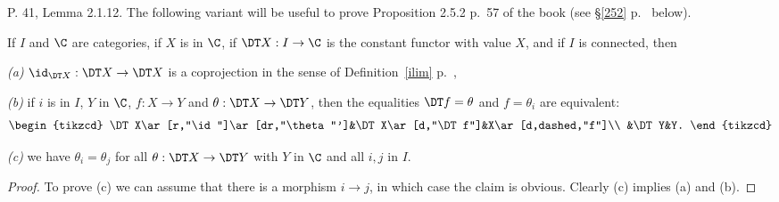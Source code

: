\documentclass[12pt]{article}
\theoremstyle{remark}
\theoremstyle{definition}
\begin{document}
\begin{s}
P. 41, Lemma 2.1.12. The following variant will be useful to prove Proposition 2.5.2 p.~57 of the book (see \S\ref{252} p.~ below).

\begin{lem}
If $I$ and $\C$ are categories, if $X$ is in $\C$, if $\DT X:I\to\C$ is the constant functor with value $X$, and if $I$ is connected, then 

\nn\emph{(a)} $\id_{\DT X}:\DT X\to\DT X$ is a coprojection in the sense of Definition~\ref{ilim} p.~,

\nn\emph{(b)} if $i$ is in $I$, $Y$ in $\C$, $f:X\to Y$ and $\theta:\DT X\to\DT Y$, then the equalities $\DT f=\theta$ and $f=\theta_i$ are equivalent: 
$$
\begin{tikzcd}
\DT X\ar[r,"\id"]\ar[dr,"\theta"']&\DT X\ar[d,"\DT f"]&X\ar[d,dashed,"f"]\\ 
&\DT Y&Y.
\end{tikzcd}
$$

\nn\emph{(c)} we have $\theta_i=\theta_j$ for all $\theta:\DT X\to\DT Y$ with $Y$ in $\C$ and all $i,j$ in $I$.
\end{lem}

\begin{proof}
To prove (c) we can assume that there is a morphism $i\to j$, in which case the claim is obvious. Clearly (c) implies (a) and (b).
\end{proof}
\end{s}

%
\end{document}
